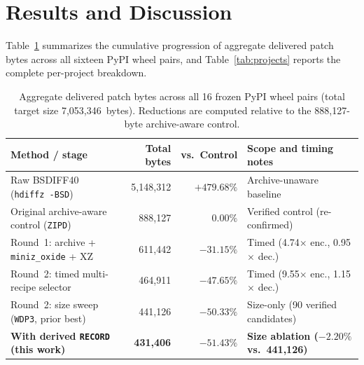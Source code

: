 \documentclass[10pt,letterpaper]{article}
\theoremstyle{remark}
\begin{document}
\section{Results and Discussion}
\label{sec:results}

Table~\ref{tab:progression} summarizes the cumulative progression of aggregate delivered patch bytes across all sixteen PyPI wheel pairs, and Table~\ref{tab:projects} reports the complete per-project breakdown.

\begin{table}[htbp]
\centering
\caption{Aggregate delivered patch bytes across all 16 frozen PyPI wheel pairs (total target size 7,053,346~bytes). Reductions are computed relative to the 888,127-byte archive-aware control.}
\label{tab:progression}
\smallskip
\small
\setlength{\tabcolsep}{5pt}
\begin{tabular}{@{}lrrl@{}}
\toprule
\textbf{Method / stage} & \textbf{Total bytes} & \textbf{vs.\ Control} & \textbf{Scope and timing notes} \\
\midrule
Raw BSDIFF40 (\texttt{hdiffz -BSD}) & 5,148,312 & $+479.68\%$ & Archive-unaware baseline \\
Original archive-aware control (\texttt{ZIPD}) & 888,127 & $0.00\%$ & Verified control (re-confirmed) \\
Round~1: archive + \texttt{miniz\_oxide} + XZ & 611,442 & $-31.15\%$ & Timed (4.74$\times$ enc., 0.95$\times$ dec.) \\
Round~2: timed multi-recipe selector & 464,911 & $-47.65\%$ & Timed (9.55$\times$ enc., 1.15$\times$ dec.) \\
Round~2: size sweep (\texttt{WDP3}, prior best) & 441,126 & $-50.33\%$ & Size-only (90 verified candidates) \\
\textbf{With derived \texttt{RECORD} (this work)} & \textbf{431,406} & \textbf{$-51.43\%$} & \textbf{Size ablation ($-2.20\%$ vs.\ 441,126)} \\
\bottomrule
\end{tabular}
\end{table}
\end{document}
